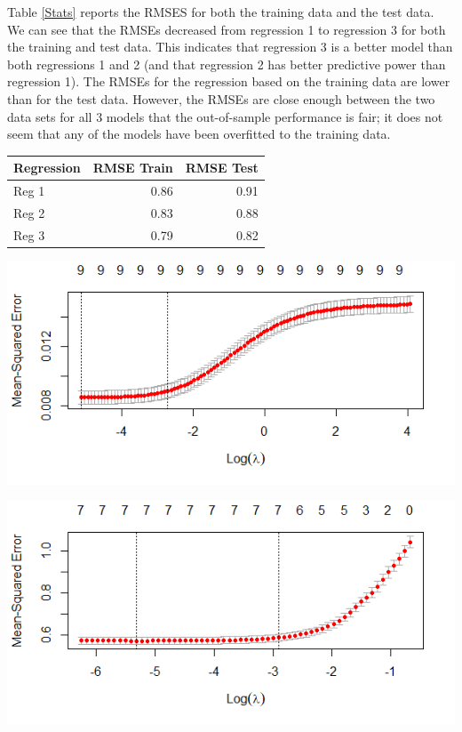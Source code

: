 \documentclass[11pt,preprint, authoryear]{elsarticle}
\let\origtable\table
\let\endorigtable\endtable
\renewenvironment{table}[1][2] {
    \expandafter\origtable\expandafter[H]
} {
    \endorigtable
}
\numberwithin{equation}{section}
\numberwithin{figure}{section}
\numberwithin{table}{section}
\begin{document}
Table \ref{Stats} reports the RMSES for both the training data and the
test data. We can see that the RMSEs decreased from regression 1 to
regression 3 for both the training and test data. This indicates that
regression 3 is a better model than both regressions 1 and 2 (and that
regression 2 has better predictive power than regression 1). The RMSEs
for the regression based on the training data are lower than for the
test data. However, the RMSEs are close enough between the two data sets
for all 3 models that the out-of-sample performance is fair; it does not
seem that any of the models have been overfitted to the training data.

\begin{table}[H]
\centering
\caption{Regression RMSEs and Observations} 
\label{Stats}
\begin{tabular}{lrr}
  \hline
Regression & RMSE Train & RMSE Test \\ 
  \hline
Reg 1 & 0.86 & 0.91 \\ 
  Reg 2 & 0.83 & 0.88 \\ 
  Reg 3 & 0.79 & 0.82 \\ 
   \hline
\end{tabular}
\end{table}

\includegraphics{"images/ridge.png"} \label{ridge}

\includegraphics{"images/lasso.png"} \label{lasso}
\end{document}
